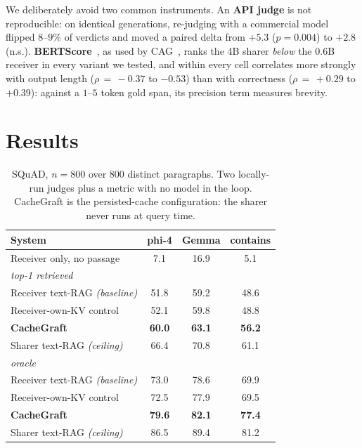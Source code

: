 \documentclass[sigconf,anonymous,review]{acmart}
\newcommand{\sys}{CacheGraft}
\newcommand{\best}[1]{\textbf{#1}}
\begin{document}
We deliberately avoid two common instruments. An \textbf{API judge} is not reproducible: on
identical generations, re-judging with a commercial model flipped $8$--$9\%$ of verdicts and moved
a paired delta from $+5.3$ ($p{=}0.004$) to $+2.8$ (n.s.). \textbf{BERTScore}~\cite{zhang2020bertscore},
as used by CAG~\cite{chan2024cag}, ranks the 4B sharer \emph{below} the 0.6B receiver in every
variant we tested, and within every cell correlates more strongly with output length
($\rho\,{=}\,{-}0.37$ to ${-}0.53$) than with correctness ($\rho\,{=}\,{+}0.29$ to ${+}0.39$):
against a $1$--$5$ token gold span, its precision term measures brevity.

\section{Results}
\label{sec:results}

\begin{table}[t]
\centering\small
\caption{SQuAD, $n{=}800$ over 800 distinct paragraphs. Two locally-run judges plus a metric with
no model in the loop. \sys{} is the persisted-cache configuration: the sharer never runs at query
time.}
\label{tab:squad}
\begin{tabular}{lccc}
\toprule
System & phi-4 & Gemma & contains \\
\midrule
Receiver only, no passage & 7.1 & 16.9 & 5.1 \\
\midrule
\multicolumn{4}{l}{\emph{top-1 retrieved}} \\
Receiver text-RAG \emph{(baseline)} & 51.8 & 59.2 & 48.6 \\
Receiver-own-KV control & 52.1 & 59.8 & 48.8 \\
\textbf{\sys{}} & \best{60.0} & \best{63.1} & \best{56.2} \\
Sharer text-RAG \emph{(ceiling)} & 66.4 & 70.8 & 61.1 \\
\midrule
\multicolumn{4}{l}{\emph{oracle}} \\
Receiver text-RAG \emph{(baseline)} & 73.0 & 78.6 & 69.9 \\
Receiver-own-KV control & 72.5 & 77.9 & 69.5 \\
\textbf{\sys{}} & \best{79.6} & \best{82.1} & \best{77.4} \\
Sharer text-RAG \emph{(ceiling)} & 86.5 & 89.4 & 81.2 \\
\bottomrule
\end{tabular}
\end{table}
\end{document}
